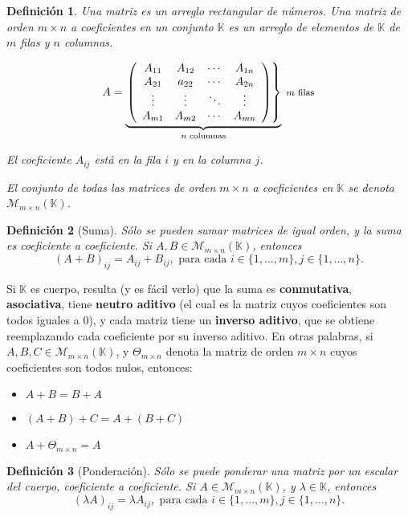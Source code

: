 \documentclass[12pt]{book}
\newtheorem{defi}{Definici\'on}
\def\K{\mathbb{K}}
\begin{document}
\begin{defi}
Una \emph{matriz} es un arreglo rectangular de números. Una matriz de orden $m\times n$ a coeficientes en un conjunto $\K$ es un arreglo de elementos de $\K$ de $m$ filas y $n$ columnas.

$$A = \underbrace{\left.\left(\begin{array}{cccc}
A_{11}& A_{12}& \cdots & A_{1n}\\
A_{21}& a_{22}& \cdots & A_{2n}\\
\vdots& \vdots& \ddots & \vdots\\
A_{m1}& A_{m2}& \cdots & A_{mn}
\end{array}\right)\right\}}_{n \textrm{ columnas}}  {\footnotesize \textrm{ $m$ filas}}$$

El coeficiente $A_{ij}$ está en la fila $i$ y en la columna $j$. 

El conjunto de todas las matrices de orden $m\times n$ a coeficientes en $\K$ se denota $\mathcal{M}_{m\times n}(\K)$.
\end{defi}


\begin{defi}[Suma]
Sólo se pueden sumar matrices de igual orden, y la suma es coeficiente a coeficiente. Si $A,B\in\mathcal{M}_{m\times n}(\K)$, entonces 
$$ (A+B)_{ij}=A_{ij}+B_{ij}, \textrm{ para cada } i\in\{1,...,m\}, j\in\{1,...,n\}.$$
\end{defi}

Si $\K$ es cuerpo, resulta (y es fácil verlo) que la suma es {\bf conmutativa}, {\bf asociativa}, tiene {\bf neutro aditivo} (el cual es la matriz cuyos coeficientes son todos iguales a 0), y cada matriz tiene un {\bf inverso aditivo}, que se obtiene reemplazando cada coeficiente por su inverso aditivo. En otras palabras, si $A,B,C\in\mathcal{M}_{m\times n}(\K)$, y $\Theta_{m\times n}$ denota la matriz de orden $m\times n$ cuyos coeficientes son todos nulos, entonces:

\begin{multicols}{3}
\begin{itemize}
\item $A+B=B+A$
\item $(A+B)+C=A+(B+C)$
\item $A+\Theta_{m\times n}=A$
\end{itemize}
\end{multicols}

 \begin{defi}[Ponderación]
Sólo se puede ponderar una matriz por un escalar del cuerpo, coeficiente a coeficiente. Si $A\in\mathcal{M}_{m\times n}(\K)$, y $\lambda\in\K$, entonces 
$$ (\lambda A)_{ij}=\lambda A_{ij}, \textrm{ para cada } i\in\{1,...,m\}, j\in\{1,...,n\}.$$
\end{defi}
\end{document}
